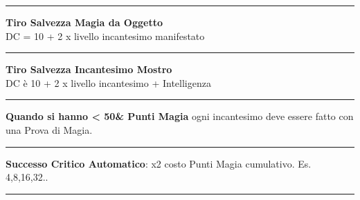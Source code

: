 \documentclass[a4paper,12 pt,openany]{book}
\newcommand{\riga}{\rule{\textwidth}{0.4pt}}
\begin{document}
\begin{textblock*}{5cm}
\riga

\textbf{Tiro Salvezza Magia da Oggetto}\\
DC = 10 + 2 x livello incantesimo manifestato

\riga

\textbf{Tiro Salvezza Incantesimo Mostro}\\
DC è 10 + 2 x livello incantesimo + Intelligenza

\riga

\textbf{Quando si hanno < 50\& Punti Magia} ogni incantesimo deve essere fatto con una Prova di Magia.

\riga

\textbf{Successo Critico Automatico}:  x2 costo Punti Magia cumulativo. Es. 4,8,16,32..

\riga

\end{textblock*}
\end{document}
